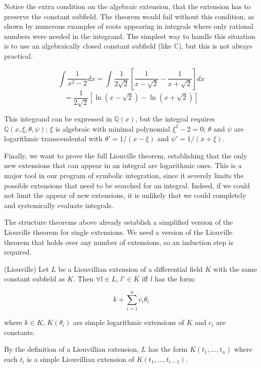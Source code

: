 \endexample

Notice the extra condition on the algebraic extension, that the
extension has to preserve the constant subfield.  The theorem would
fail without this condition, as shown by numerous examples of roots
appearing in integrals where only rational numbers were needed in the
integrand.  The simplest way to handle this situation is to use an
algebraically closed constant subfield (like ${\mathbb C}$), but
this is not always practical.

\example

$$\int \frac{1}{x^2-2} dx = \int \frac{1}{2\sqrt{2}} \left[ \frac{1}{x-\sqrt{2}} - \frac{1}{x+\sqrt{2}} \right] dx$$
$$= \frac{1}{2\sqrt{2}} \left[ \ln(x-\sqrt{2}) - \ln(x+\sqrt{2}) \right]$$

This integrand can be expressed in ${\mathbb Q}(x)$, but the integral
requires ${\mathbb Q}(x,\xi,\theta,\psi)$; $\xi$ is algebraic
with minimal polynomial $\xi^2-2=0$; $\theta$ and $\psi$ are
logarithmic transcendental with $\theta' = 1/(x-\xi)$
and $\psi' = 1/(x+\xi)$.

\endexample

Finally, we want to prove the full Liouville theorem, establishing
that the only new extensions that can appear in an integral are
logarithmic ones.  This is a major tool in our program of symbolic
integration, since it severely limits the possible extensions that
need to be searched for an integral.  Indeed, if we could not
limit the appear of new extensions, it is unlikely that we
could completely and systemically evaluate integrals.

The structure theorems above already establish a simplified version of
the Liouville theorem for single extensions.  We need a version of the
Liouville theorem that holds over any number of extensions, so
an induction step is required.

\theorem\label{weak Liouville theorem} (Liouville)
Let $L$ be a Liouvillian extension of a differential field $K$ with
the same constant subfield as $K$.  Then $\forall l \in L$, $l' \in K$
iff $l$ has the form:

$$k + \sum_{i=1}^n c_i \theta_i$$

where $k\in K$, $K(\theta_i)$ are simple logarithmic extensions of $K$ and $c_i$
are constants.

\proof

By the definition of a Liouvillian extension, $L$ has the form $K(t_1,\ldots,t_n)$
where each $t_i$ is a simple Liouvillian extension of $K(t_1,\ldots,t_{i-1})$.

